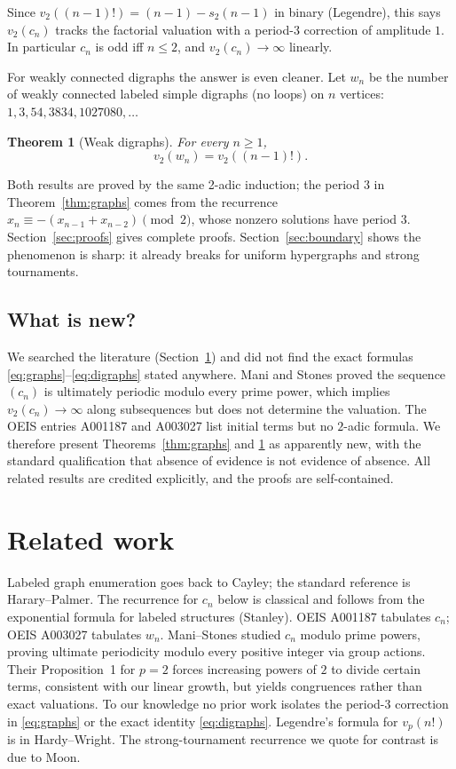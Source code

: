 \documentclass[11pt]{article}
\newtheorem{theorem}{Theorem}[section]
\theoremstyle{definition}
\begin{document}
Since $v_2((n-1)!) = (n-1) - s_2(n-1)$ in binary (Legendre), this says
$v_2(c_n)$ tracks the factorial valuation with a period-$3$ correction
of amplitude $1$. In particular $c_n$ is odd iff $n \le 2$, and
$v_2(c_n) \to \infty$ linearly.

For weakly connected digraphs the answer is even cleaner. Let $w_n$ be
the number of weakly connected labeled simple digraphs (no loops) on
$n$ vertices: $1, 3, 54, 3834, 1027080, \dots$

\begin{theorem}[Weak digraphs]\label{thm:digraphs}
For every $n \ge 1$,
\begin{equation}\label{eq:digraphs}
v_2(w_n) = v_2((n-1)!).
\end{equation}
\end{theorem}

Both results are proved by the same 2-adic induction; the period $3$
in Theorem~\ref{thm:graphs} comes from the recurrence
$x_n \equiv -(x_{n-1}+x_{n-2}) \pmod 2$, whose nonzero solutions have
period $3$. Section~\ref{sec:proofs} gives complete proofs.
Section~\ref{sec:boundary} shows the phenomenon is sharp: it already
breaks for uniform hypergraphs and strong tournaments.

\subsection*{What is new?}
We searched the literature (Section~\ref{sec:related}) and did not find
the exact formulas \eqref{eq:graphs}--\eqref{eq:digraphs} stated anywhere.
Mani and Stones proved the sequence $(c_n)$ is ultimately periodic
modulo every prime power, which implies $v_2(c_n) \to \infty$ along
subsequences but does not determine the valuation.
The OEIS entries A001187 and A003027 list initial terms but no
$2$-adic formula. We therefore present Theorems~\ref{thm:graphs} and
\ref{thm:digraphs} as apparently new, with the standard qualification
that absence of evidence is not evidence of absence. All related results
are credited explicitly, and the proofs are self-contained.

\section{Related work}\label{sec:related}
Labeled graph enumeration goes back to Cayley; the standard reference is
Harary--Palmer. The recurrence for $c_n$ below is classical and follows
from the exponential formula for labeled structures (Stanley).
OEIS A001187 tabulates $c_n$; OEIS A003027 tabulates $w_n$.
Mani--Stones studied $c_n$ modulo prime powers, proving ultimate
periodicity modulo every positive integer via group actions. Their
Proposition~1 for $p=2$ forces increasing powers of $2$ to divide certain
terms, consistent with our linear growth, but yields congruences rather
than exact valuations. To our knowledge no prior work isolates the
period-$3$ correction in \eqref{eq:graphs} or the exact identity
\eqref{eq:digraphs}. Legendre's formula for $v_p(n!)$ is in
Hardy--Wright. The strong-tournament recurrence we quote for contrast is
due to Moon.
\end{document}
